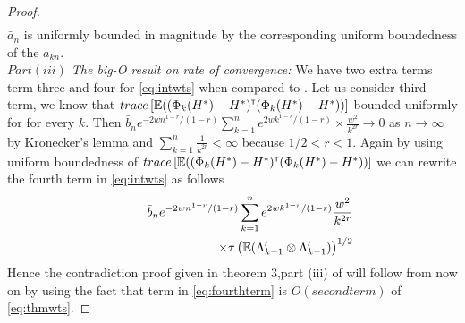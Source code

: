 \begin{proof}
\begin{align}
\end{align} $\bar a_n$ is uniformly bounded in magnitude by the corresponding uniform boundedness of the $a_{kn}$.\\
\emph{$Part(iii)$ The big-O result on rate of convergence:}
 We have two extra terms term three and four for \eqref{eq:intwts} when compared to \cite{spall-jacobian}. Let us consider third term, we know that $trace\left[\mathbb{E} ((\Phi_k(H^*) - H^*) ^\mathsf{\scriptscriptstyle T}  (\Phi_k(H^*) - H^*))\right]$ bounded uniformly for for every $k$. Then  $\bar b_n e^{-2 w n^{1-r}/(1-r)} \sum_{k=1}^n e^{2 w k^{1-r}/(1-r)}  \times \frac{w^2}{k^{2 r}} \to 0$ as $n \to \infty$ by Kronecker's lemma and $\sum_{k=1}^n \frac{1}{k^{2 r}} < \infty$ because $1/2 < r < 1$.  Again by using uniform boundedness of $trace\left[\mathbb{E} ((\Phi_k(H^*) - H^*) ^\mathsf{\scriptscriptstyle T}  (\Phi_k(H^*) - H^*))\right]$ we can rewrite  the fourth term in \eqref{eq:intwts} as follows 
 \begin{align}\label{eq:fourthterm}
 \bar b_n e^{-2 w n^{1-r}/(1-r)} \sum_{k=1}^n e^{2 w k^{1-r}/(1-r)}  \frac{w^2}{k^{2 r}} \nonumber \\ \hspace{3cm}\times \tau\left(\E (\Lambda_{k-1}' \otimes \Lambda_{k-1}')\right)^{1/2}
 \end{align}
 Hence the contradiction proof given in theorem 3,part (iii) of \cite{spall-jacobian} will follow from now on by using the fact that term in \eqref{eq:fourthterm} is $O(second term)$ of \eqref{eq:thmwts}. 
 
 
\end{proof}